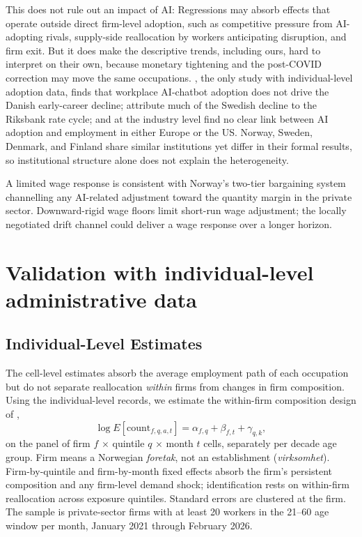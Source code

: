 \documentclass[12pt]{article}
\begin{document}
This does not rule out an impact of AI: Regressions may absorb effects that operate outside direct firm-level adoption, such as competitive pressure from AI-adopting rivals, supply-side reallocation by workers anticipating disruption, and firm exit. But it does make the descriptive trends, including ours, hard to interpret on their own, because monetary tightening and the post-COVID correction may move the same occupations. \citet{humlum2026}, the only study with individual-level adoption data, finds that workplace AI-chatbot adoption does not drive the Danish early-career decline; \citet{lodefalk2026} attribute much of the Swedish decline to the Riksbank rate cycle; and at the industry level \citet{bick2026} find no clear link between AI adoption and employment in either Europe or the US. Norway, Sweden, Denmark, and Finland share similar institutions yet differ in their formal results, so institutional structure alone does not explain the heterogeneity.

A limited wage response is consistent with Norway's two-tier bargaining system \citep{bhuller2022} channelling any AI-related adjustment toward the quantity margin in the private sector. Downward-rigid wage floors limit short-run wage adjustment; the locally negotiated drift channel could deliver a wage response over a longer horizon. 


\section{Validation with individual-level administrative data}\label{sec:validation}

\subsection{Individual-Level Estimates}\label{sec:regression:firmfe}

The cell-level estimates absorb the average employment path of each occupation but do not separate reallocation \emph{within} firms from changes in firm composition. Using the individual-level records, we estimate the within-firm composition design of \citet{brynjolfsson2025},
\[
\log E[\text{count}_{f,q,a,t}] = \alpha_{f,q} + \beta_{f,t} + \gamma_{q,k},
\]
on the panel of firm $f$ $\times$ quintile $q$ $\times$ month $t$ cells, separately per decade age group. Firm means a Norwegian \emph{foretak}, not an establishment (\emph{virksomhet}). Firm-by-quintile and firm-by-month fixed effects absorb the firm's persistent composition and any firm-level demand shock; identification rests on within-firm reallocation across exposure quintiles. Standard errors are clustered at the firm. The sample is private-sector firms with at least 20 workers in the 21--60 age window per month, January 2021 through February 2026.
\end{document}
